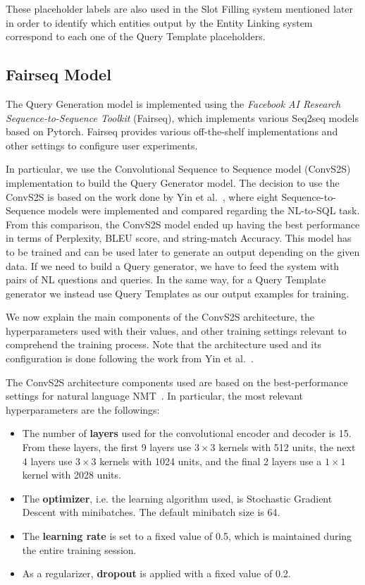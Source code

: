 These placeholder labels are also used in the Slot Filling system mentioned later in order to 
identify which entities output by the Entity Linking system correspond to each one of the 
Query Template placeholders. 

\subsection{Fairseq Model}
\label{cap3:system/queryGenModule/fairseqModel}
The Query Generation model is implemented using the \textit{Facebook AI Research Sequence-to-Sequence 
Toolkit} (Fairseq), which implements various Seq2seq models based on Pytorch. Fairseq 
provides various off-the-shelf implementations and other settings to configure user 
experiments. 

In particular, we use the Convolutional Sequence to Sequence model (ConvS2S)~\cite{nmt:convS2S-GehringAGYD17} 
implementation to build the Query Generator model. The decision to use the ConvS2S is based 
on the work done by Yin et al.~\cite{nmt:nl-to-sparql-Yin19}, where eight Sequence-to-Sequence 
models were implemented and compared regarding the NL-to-SQL task. From this comparison, 
the ConvS2S model ended up having the best performance in terms of Perplexity, BLEU score, 
and string-match Accuracy. This model has to be trained and can be used later to generate an 
output depending on the given data. If we need to build a \SPARQL{} Query generator, we have to 
feed the system with pairs of NL questions and \SPARQL{} queries. In the same way, for a Query 
Template generator we instead use Query Templates as our output examples for training.

We now explain the main components of the ConvS2S architecture, the hyperparameters used with 
their values, and other training settings relevant to comprehend the training process. Note 
that the architecture used and its configuration is done following the work from 
Yin et al.~\cite{nmt:nl-to-sparql-Yin19}.

The ConvS2S architecture components used are based on the best-performance settings for 
natural language NMT~\cite{nmt:nl-to-sparql-Yin19}. In particular, the most relevant 
hyperparameters are the followings:

\begin{itemize}
    \item The number of \textbf{layers} used for the convolutional encoder and decoder is 15. 
    From these layers, the first 9 layers use $3 \times 3$ kernels with 512 units, the next 4 layers 
    use $3 \times 3$ kernels with 1024 units, and the final 2 layers use a $1 \times 1$ kernel with 2028 units.
    \item The \textbf{optimizer}, i.e. the learning algorithm used, is Stochastic Gradient 
    Descent with minibatches. The default minibatch size is 64.
    \item The \textbf{learning rate} is set to a fixed value of 0.5, which is maintained during 
    the entire training session.
    \item As a regularizer, \textbf{dropout} is applied with a fixed value of 0.2.
\end{itemize}

